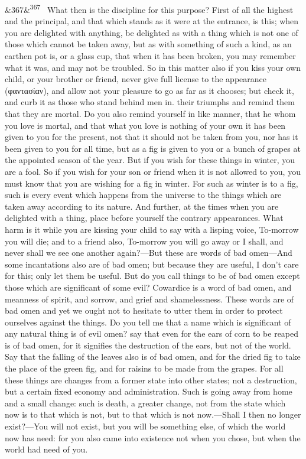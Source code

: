 \documentclass[12pt]{article}
\newcommand{\para}[1][]{\par\noindent\ifx&#1&\else\textsuperscript{\footnotesize #1}~\fi}
\begin{document}
\para[367] What then is the discipline for this purpose? First of all the highest and the principal, and that which stands as it were at the entrance, is this; when you are delighted with anything, be delighted as with a thing which is not one of those which cannot be taken away, but as with something of such a kind, as an earthen pot is, or a glass cup, that when it has been broken, you may remember what it was, and may not be troubled. So in this matter also if you kiss your own child, or your brother or friend, never give full license to the appearance (φαντασίαν), and allow not your pleasure to go as far as it chooses; but check it, and curb it as those who stand behind men in. their triumphs and remind them that they are mortal. Do you also remind yourself in like manner, that he whom you love is mortal, and that what you love is nothing of your own it has been given to you for the present, not that it should not be taken from you, nor has it been given to you for all time, but as a fig is given to you or a bunch of grapes at the appointed season of the year. But if you wish for these things in winter, you are a fool. So if you wish for your son or friend when it is not allowed to you, you must know that you are wishing for a fig in winter. For such as winter is to a fig, such is every event which happens from the universe to the things which are taken away according to its nature. And further, at the times when you are delighted with a thing, place before yourself the contrary appearances. What harm is it while you are kissing your child to say with a lisping voice, To-morrow you will die; and to a friend also, To-morrow you will go away or I shall, and never shall we see one another again?—But these are words of bad omen—And some incantations also are of bad omen; but because they are useful, I don't care for this; only let them be useful. But do you call things to be of bad omen except those which are significant of some evil? Cowardice is a word of bad omen, and meanness of spirit, and sorrow, and grief and shamelessness. These words are of bad omen and yet we ought not to hesitate to utter them in order to protect ourselves against the things. Do you tell me that a name which is significant of any natural thing is of evil omen? say that even for the ears of corn to be reaped is of bad omen, for it signifies the destruction of the ears, but not of the world. Say that the falling of the leaves also is of bad omen, and for the dried fig to take the place of the green fig, and for raisins to be made from the grapes. For all these things are changes from a former state into other states; not a destruction, but a certain fixed economy and administration. Such is going away from home and a small change: such is death, a greater change, not from the state which now is to that which is not, but to that which is not now.—Shall I then no longer exist?—You will not exist, but you will be something else, of which the world now has need: for you also came into existence not when you chose, but when the world had need of you.
\end{document}
